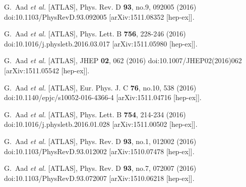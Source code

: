\begin{thebibliography}{9}
G.~Aad \textit{et al.} [ATLAS],
Phys. Rev. D \textbf{93}, no.9, 092005 (2016)
doi:10.1103/PhysRevD.93.092005
[arXiv:1511.08352 [hep-ex]].

G.~Aad \textit{et al.} [ATLAS],
Phys. Lett. B \textbf{756}, 228-246 (2016)
doi:10.1016/j.physletb.2016.03.017
[arXiv:1511.05980 [hep-ex]].

G.~Aad \textit{et al.} [ATLAS],
JHEP \textbf{02}, 062 (2016)
doi:10.1007/JHEP02(2016)062
[arXiv:1511.05542 [hep-ex]].

G.~Aad \textit{et al.} [ATLAS],
Eur. Phys. J. C \textbf{76}, no.10, 538 (2016)
doi:10.1140/epjc/s10052-016-4366-4
[arXiv:1511.04716 [hep-ex]].

G.~Aad \textit{et al.} [ATLAS],
Phys. Lett. B \textbf{754}, 214-234 (2016)
doi:10.1016/j.physletb.2016.01.028
[arXiv:1511.00502 [hep-ex]].

G.~Aad \textit{et al.} [ATLAS],
Phys. Rev. D \textbf{93}, no.1, 012002 (2016)
doi:10.1103/PhysRevD.93.012002
[arXiv:1510.07478 [hep-ex]].

G.~Aad \textit{et al.} [ATLAS],
Phys. Rev. D \textbf{93}, no.7, 072007 (2016)
doi:10.1103/PhysRevD.93.072007
[arXiv:1510.06218 [hep-ex]].


\end{thebibliography}
